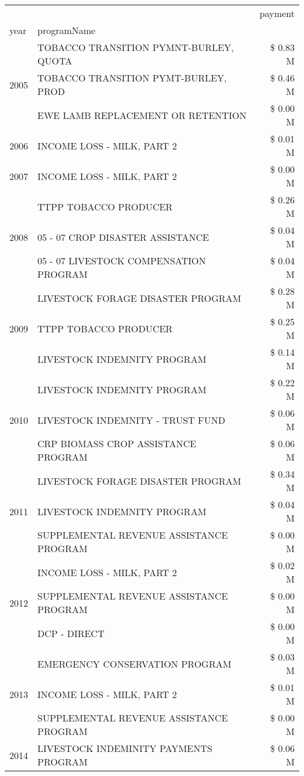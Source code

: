 \begin{tabular}{llr}
\toprule
 &  & payment \\
year & programName &  \\
\midrule
\multirow[t]{3}{*}{2005} & TOBACCO TRANSITION PYMNT-BURLEY, QUOTA & \$ 0.83 M \\
 & TOBACCO TRANSITION PYMT-BURLEY, PROD & \$ 0.46 M \\
 & EWE LAMB REPLACEMENT OR RETENTION & \$ 0.00 M \\
\cline{1-3}
2006 & INCOME LOSS - MILK, PART 2 & \$ 0.01 M \\
\cline{1-3}
2007 & INCOME LOSS - MILK, PART 2 & \$ 0.00 M \\
\cline{1-3}
\multirow[t]{3}{*}{2008} & TTPP TOBACCO PRODUCER & \$ 0.26 M \\
 & 05 - 07 CROP DISASTER ASSISTANCE & \$ 0.04 M \\
 & 05 - 07 LIVESTOCK COMPENSATION PROGRAM & \$ 0.04 M \\
\cline{1-3}
\multirow[t]{3}{*}{2009} & LIVESTOCK FORAGE DISASTER  PROGRAM & \$ 0.28 M \\
 & TTPP TOBACCO PRODUCER & \$ 0.25 M \\
 & LIVESTOCK INDEMNITY PROGRAM & \$ 0.14 M \\
\cline{1-3}
\multirow[t]{3}{*}{2010} & LIVESTOCK INDEMNITY PROGRAM & \$ 0.22 M \\
 & LIVESTOCK INDEMNITY - TRUST FUND & \$ 0.06 M \\
 & CRP BIOMASS CROP ASSISTANCE PROGRAM & \$ 0.06 M \\
\cline{1-3}
\multirow[t]{3}{*}{2011} & LIVESTOCK FORAGE DISASTER PROGRAM & \$ 0.34 M \\
 & LIVESTOCK INDEMNITY PROGRAM & \$ 0.04 M \\
 & SUPPLEMENTAL REVENUE ASSISTANCE PROGRAM & \$ 0.00 M \\
\cline{1-3}
\multirow[t]{3}{*}{2012} & INCOME LOSS - MILK, PART 2 & \$ 0.02 M \\
 & SUPPLEMENTAL REVENUE ASSISTANCE PROGRAM & \$ 0.00 M \\
 & DCP - DIRECT & \$ 0.00 M \\
\cline{1-3}
\multirow[t]{3}{*}{2013} & EMERGENCY CONSERVATION PROGRAM & \$ 0.03 M \\
 & INCOME LOSS - MILK, PART 2 & \$ 0.01 M \\
 & SUPPLEMENTAL REVENUE ASSISTANCE PROGRAM & \$ 0.00 M \\
\cline{1-3}
\multirow[t]{3}{*}{2014} & LIVESTOCK INDEMINITY PAYMENTS PROGRAM & \$ 0.06 M \\

\end{tabular}
